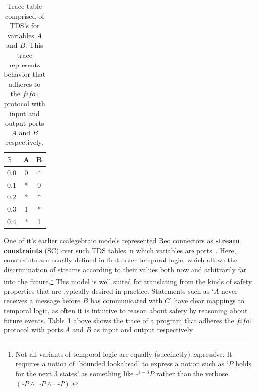 \begin{table}[]
	\centering
	\begin{tabular}{l|cc}
		$\mathbb{R}$  & A & B \\ \hline
		0.0 & 0 & * \\
		0.1 & * & 0 \\
		0.2 & * & * \\
		0.3 & 1 & * \\
		0.4 & * & 1
	\end{tabular}
	\caption[Trace table of a system adherent to fifo1.]{Trace table comprised of TDS's for variables $A$ and $B$. This trace represents behavior that adheres to the $fifo1$ protocol with input and output ports $A$ and $B$ respectively.}
	\label{tab:fifo1_eg}
\end{table}


One of it's earlier coalegebraic models represented Reo connectors as \textbf{stream constraints} (SC) over such TDS tables in which variables are ports~\cite{arbab2004reo}. Here, constraints are usually defined in first-order temporal logic, which allows the discrimination of streams according to their values both now and arbitrarily far into the future.\footnote{Not all variants of temporal logic are equally (succinctly) expressive. It requires a notion of `bounded lookahead' to express a notion such as `$P$ holds for the next 3 states' as something like $\square ^{1-3} P$ rather than the verbose $(\square P \wedge \square \square P \wedge \square \square \square P)$.} This model is well suited for translating from the kinds of safety properties that are typically desired in practice. Statements such as `$A$ never receives a message before $B$ has communicated with $C$' have clear mappings to temporal logic, as often it is intuitive to reason about safety by reasoning about future events. Table~\ref{tab:fifo1_eg} above shows the trace of a program that adheres the $fifo1$ protocol with ports $A$ and $B$ as input and output respectively.

